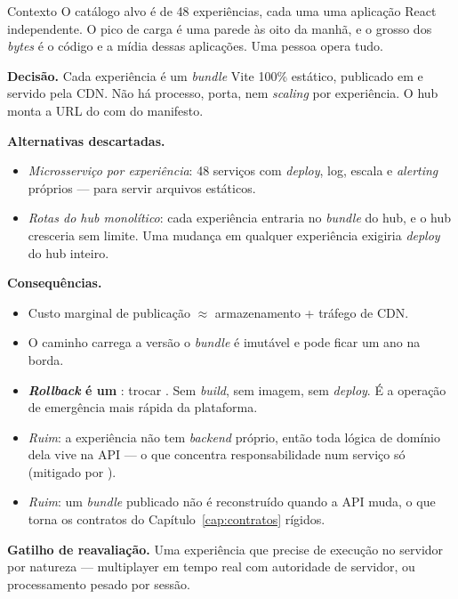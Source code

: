 \begin{especificacao}{Contexto}
O catálogo alvo é de 48 experiências, cada uma uma aplicação React independente.
O pico de carga é uma parede às oito da manhã, e o grosso dos \emph{bytes} é o
código e a mídia dessas aplicações. Uma pessoa opera tudo.
\end{especificacao}

\textbf{Decisão.} Cada experiência é um \emph{bundle} Vite 100\% estático,
publicado em  e servido pela
CDN. Não há processo, porta, nem \emph{scaling} por experiência. O hub monta a URL
do  com  do manifesto.

\textbf{Alternativas descartadas.}
\begin{itemize}
  \item \emph{Microsserviço por experiência}: 48 serviços com \emph{deploy}, log,
    escala e \emph{alerting} próprios --- para servir arquivos estáticos.
  \item \emph{Rotas do hub monolítico}: cada experiência entraria no \emph{bundle}
    do hub, e o hub cresceria sem limite. Uma mudança em qualquer experiência
    exigiria \emph{deploy} do hub inteiro.
\end{itemize}

\textbf{Consequências.}
\begin{itemize}
  \item Custo marginal de publicação $\approx$ armazenamento + tráfego de CDN.
  \item O caminho carrega a versão \implica{} o \emph{bundle} é imutável e pode
    ficar um ano na borda.
  \item \textbf{\emph{Rollback} é um }: trocar . Sem
    \emph{build}, sem imagem, sem \emph{deploy}. É a operação de emergência mais
    rápida da plataforma.
  \item \emph{Ruim}: a experiência não tem \emph{backend} próprio, então toda
    lógica de domínio dela vive na API --- o que concentra responsabilidade num
    serviço só (mitigado por ).
  \item \emph{Ruim}: um \emph{bundle} publicado não é reconstruído quando a API
    muda, o que torna os contratos do Capítulo~\ref{cap:contratos} rígidos.
\end{itemize}

\textbf{Gatilho de reavaliação.} Uma experiência que precise de execução no
servidor por natureza --- multiplayer em tempo real com autoridade de servidor, ou
processamento pesado por sessão.

